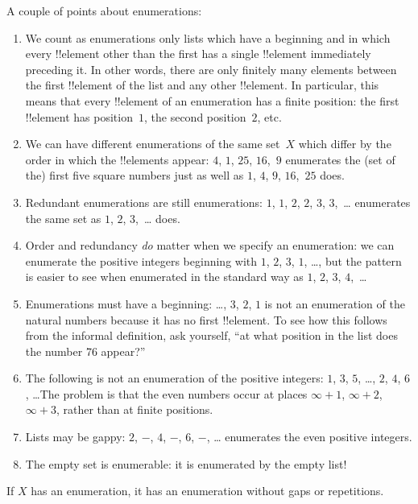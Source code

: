 \documentclass[../../../include/open-logic-section]{subfiles}
\begin{document}
\begin{explain}
A couple of points about enumerations:
\begin{enumerate}
\item We count as enumerations only lists which have a beginning and
  in which every !!{element} other than the first has a single
  !!{element} immediately preceding it.  In other words, there are
  only finitely many elements between the first !!{element} of the
  list and any other !!{element}. In particular, this means that every
  !!{element} of an enumeration has a finite position: the first
  !!{element} has position~$1$, the second position~$2$, etc.
\item We can have different enumerations of the same set~$X$ which
  differ by the order in which the !!{element}s appear: $4$, $1$,
  $25$, $16$,~$9$ enumerates the (set of the) first five square
  numbers just as well as $1$, $4$, $9$, $16$,~$25$ does.
\item Redundant enumerations are still enumerations: $1$, $1$, $2$,
  $2$, $3$, $3$,~\dots{} enumerates the same set as $1$, $2$,
  $3$,~\dots{} does.
\item Order and redundancy \emph{do} matter when we specify an
  enumeration: we can enumerate the positive integers beginning with
  $1$, $2$, $3$, $1$, \dots{}, but the pattern is easier to see when
  enumerated in the standard way as $1$, $2$, $3$, $4$,~\dots
\item Enumerations must have a beginning: \dots, $3$, $2$, $1$ is not
  an enumeration of the natural numbers because it has no first
  !!{element}. To see how this follows from the informal definition,
  ask yourself, ``at what position in the list does the number 76
  appear?''
\item The following is not an enumeration of the positive integers:
  $1$, $3$, $5$, \dots, $2$, $4$, $6$, \dots\@ The problem is that the
  even numbers occur at places $\infty + 1$, $\infty + 2$, $\infty +
  3$, rather than at finite positions.
\item Lists may be gappy: $2$, $-$, $4$, $-$, $6$, $-$, \dots{}
  enumerates the even positive integers.
\item The empty set is enumerable: it is enumerated by the empty list!{}
\end{enumerate}
\end{explain}

\begin{prop}
  If $X$ has an enumeration, it has an enumeration without gaps or
  repetitions.
\end{prop}
\end{document}

